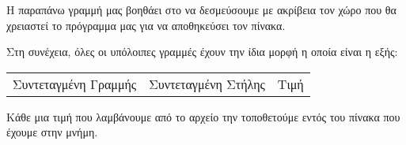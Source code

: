 Η παραπάνω γραμμή μας βοηθάει στο να δεσμεύσουμε με ακρίβεια τον χώρο που θα χρειαστεί το πρόγραμμα μας για να αποθηκεύσει τον πίνακα. 

Στη συνέχεια, όλες οι υπόλοιπες γραμμές έχουν την ίδια μορφή η οποία είναι η εξής:

\begin{center}
\begin{tabular}{ c c c }
 Συντεταγμένη Γραμμής & Συντεταγμένη Στήλης & Τιμή
\end{tabular}
\end{center}

Κάθε μια τιμή που λαμβάνουμε από το αρχείο την τοποθετούμε εντός του πίνακα που έχουμε στην μνήμη.

